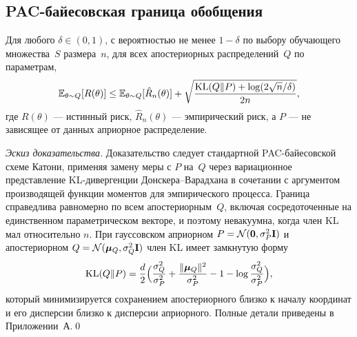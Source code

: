 \subsection{PAC-байесовская граница обобщения}

\begin{theorem}
\label{thm:pac_bayes}
Для любого $\delta\in(0,1)$, с вероятностью не менее $1-\delta$ по выбору обучающего множества~$S$ размера~$n$, для всех апостериорных распределений~$Q$ по параметрам,
\begin{equation}
\mathbb{E}_{\theta\sim Q}[R(\theta)]
\le \mathbb{E}_{\theta\sim Q}[\hat{R}_n(\theta)]
+ \sqrt{\frac{\mathrm{KL}(Q\|P)+\log(2\sqrt{n}/\delta)}{2n}},
\label{eq:pac_bayes}
\end{equation}
где $R(\theta)$ --- истинный риск, $\hat{R}_n(\theta)$ --- эмпирический риск, а $P$ --- не зависящее от данных априорное распределение.
\end{theorem}

\noindent\textit{Эскиз доказательства.} Доказательство следует стандартной PAC-байесовской схеме Катони, применяя замену меры с $P$ на~$Q$ через вариационное представление KL-дивергенции Донскера--Варадхана в сочетании с аргументом производящей функции моментов для эмпирического процесса. Граница справедлива равномерно по всем апостериорным~$Q$, включая сосредоточенные на единственном параметрическом векторе, и поэтому невакуумна, когда член KL мал относительно $n$. При гауссовском априорном $P=\mathcal{N}(\mathbf{0},\sigma_P^2\mathbf{I})$ и апостериорном $Q=\mathcal{N}(\bm{\mu}_Q,\sigma_Q^2\mathbf{I})$ член KL имеет замкнутую форму
\begin{equation}
\mathrm{KL}(Q\|P)
= \frac{d}{2}\Bigl(
  \frac{\sigma_Q^2}{\sigma_P^2}
  + \frac{\|\bm{\mu}_Q\|^2}{\sigma_P^2}
  - 1
  - \log\frac{\sigma_Q^2}{\sigma_P^2}
\Bigr),
\label{eq:pac_kl_gauss}
\end{equation}
который минимизируется сохранением апостериорного близко к началу координат и его дисперсии близко к дисперсии априорного. Полные детали приведены в Приложении~А.\qed

